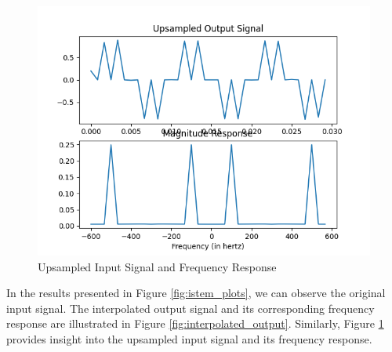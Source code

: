 \documentclass{article}
\begin{document}
\begin{figure}[ht]
  \centering
  \includegraphics[scale=0.8]{./dsp/figs/iupsampled_output.png}
  \caption{Upsampled Input Signal and Frequency Response}
  \label{fig:iupsampled_output}
\end{figure}
In the results presented in Figure \ref{fig:istem_plots}, we can observe the original input signal. The interpolated output signal and its corresponding frequency response are illustrated in Figure \ref{fig:interpolated_output}. Similarly, Figure \ref{fig:iupsampled_output} provides insight into the upsampled input signal and its frequency response.
\end{document}
